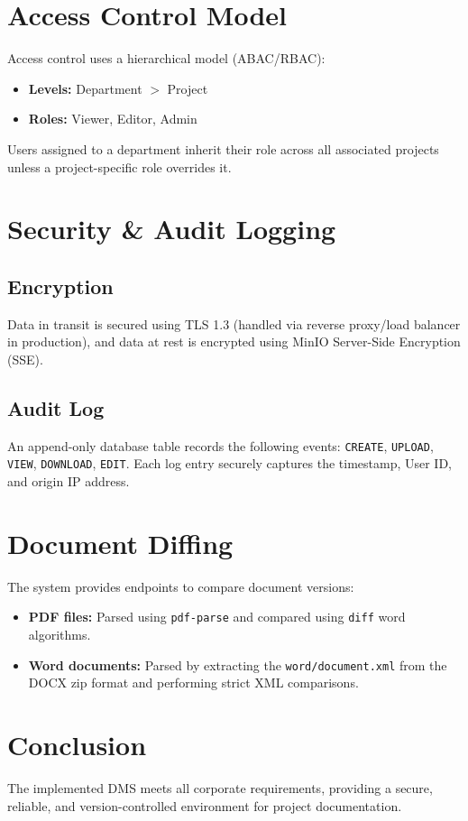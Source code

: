 \documentclass[12pt,a4paper]{article}
\begin{document}
\section{Access Control Model}
Access control uses a hierarchical model (ABAC/RBAC):
\begin{itemize}
    \item \textbf{Levels:} Department $>$ Project
    \item \textbf{Roles:} Viewer, Editor, Admin
\end{itemize}
Users assigned to a department inherit their role across all associated projects unless a project-specific role overrides it.

\section{Security \& Audit Logging}
\subsection{Encryption}
Data in transit is secured using TLS 1.3 (handled via reverse proxy/load balancer in production), and data at rest is encrypted using MinIO Server-Side Encryption (SSE).
\subsection{Audit Log}
An append-only database table records the following events:
\texttt{CREATE}, \texttt{UPLOAD}, \texttt{VIEW}, \texttt{DOWNLOAD}, \texttt{EDIT}.
Each log entry securely captures the timestamp, User ID, and origin IP address.

\section{Document Diffing}
The system provides endpoints to compare document versions:
\begin{itemize}
    \item \textbf{PDF files:} Parsed using \texttt{pdf-parse} and compared using \texttt{diff} word algorithms.
    \item \textbf{Word documents:} Parsed by extracting the \texttt{word/document.xml} from the DOCX zip format and performing strict XML comparisons.
\end{itemize}

\section{Conclusion}
The implemented DMS meets all corporate requirements, providing a secure, reliable, and version-controlled environment for project documentation.
\end{document}
